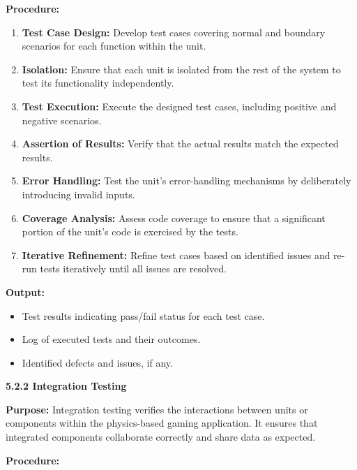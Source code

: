 \documentclass[
]{article}
\begin{document}
\textbf{Procedure:}

\begin{enumerate}
\def\labelenumi{\arabic{enumi}.}
\item
  \textbf{Test Case Design:} Develop test cases covering normal and
  boundary scenarios for each function within the unit.
\item
  \textbf{Isolation:} Ensure that each unit is isolated from the rest of
  the system to test its functionality independently.
\item
  \textbf{Test Execution:} Execute the designed test cases, including
  positive and negative scenarios.
\item
  \textbf{Assertion of Results:} Verify that the actual results match
  the expected results.
\item
  \textbf{Error Handling:} Test the unit's error-handling mechanisms by
  deliberately introducing invalid inputs.
\item
  \textbf{Coverage Analysis:} Assess code coverage to ensure that a
  significant portion of the unit's code is exercised by the tests.
\item
  \textbf{Iterative Refinement:} Refine test cases based on identified
  issues and re-run tests iteratively until all issues are resolved.
\end{enumerate}

\textbf{Output:}

\begin{itemize}
\item
  Test results indicating pass/fail status for each test case.
\item
  Log of executed tests and their outcomes.
\item
  Identified defects and issues, if any.
\end{itemize}

\textbf{5.2.2 Integration Testing}

\textbf{Purpose:} Integration testing verifies the interactions between
units or components within the physics-based gaming application. It
ensures that integrated components collaborate correctly and share data
as expected.

\textbf{Procedure:}
\end{document}
